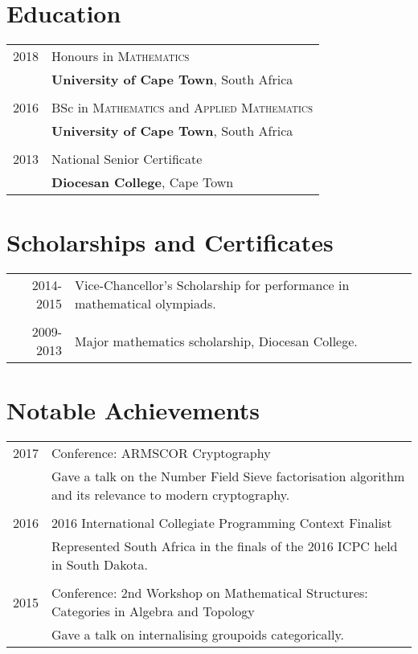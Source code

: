 \documentclass[a4paper,10pt]{article}
\begin{document}
\vspace{2em}

\section{Education}
\begin{tabular}{rl}
    2018 & Honours in \textsc{Mathematics} \\
         & \textbf{University of Cape Town}, South Africa \\
         & \\

    2016 & BSc in \textsc{Mathematics} and \textsc{Applied Mathematics} \\
         & \textbf{University of Cape Town}, South Africa \\
         & \\

    2013 & National Senior Certificate \\
         & \normalsize\textbf{Diocesan College}, Cape Town \\
\end{tabular}

\newpage
\section{Scholarships and Certificates}
\begin{tabular}{rl}
    2014-2015 & Vice-Chancellor's Scholarship for performance in mathematical olympiads. \\
              & \\
    2009-2013 & Major mathematics scholarship, Diocesan College. \\
\end{tabular}

\vspace{2em}

\section{Notable Achievements}
\begin{tabular}{rl}
    2017 & Conference: ARMSCOR Cryptography \\
         & \footnotesize{Gave a talk on the Number Field Sieve factorisation algorithm and its relevance to modern cryptography.} \\
         & \\

    2016 & 2016 International Collegiate Programming Context Finalist \\
         & \footnotesize{Represented South Africa in the finals of the 2016 ICPC held in South Dakota.} \\
         & \\

    2015 & Conference: 2nd Workshop on Mathematical Structures: Categories in Algebra and Topology \\
         & \footnotesize{Gave a talk on internalising groupoids categorically.} \\
\end{tabular}
\end{document}
